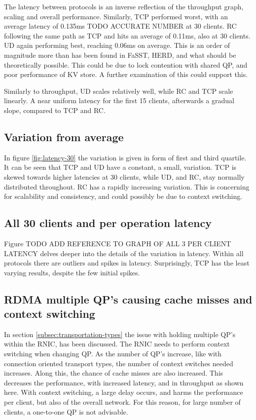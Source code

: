 The latency between protocols is an inverse reflection of the throughput graph, scaling and overall performance.
Similarly, TCP performed worst, with an average latency of 0.135ms TODO ACCURATE NUMBER at 30 clients.
RC following the same path as TCP and hits an average of 0.11ms, also at 30 clients.
UD again performing best, reaching 0.06ms on average.
This is an order of magnitude more than has been found in FaSST\cite{kalia2016fasst}, HERD\cite{kalia2014using}, and what should be theoretically possible.
This could be due to lock contention with shared QP, and poor performance of KV store.
A further examination of this could support this.

Similarly to throughput, UD scales relatively well, while RC and TCP scale linearly.
A near uniform latency for the first 15 clients, afterwards a gradual slope, compared to TCP and RC.

\subsection{Variation from average}
In figure \ref{fig:latency-30} the variation is given in form of first and third quartile.
It can be seen that TCP and UD have a constant, a small, variation.
TCP is skewed towards higher latencies at 30 clients, while UD, and RC, stay normally distributed throughout.
RC has a rapidly increasing variation.
This is concerning for scalability and consistency, and could possibly be due to context switching.

\subsection{All 30 clients and per operation latency}\label{subsec:all-30-clients-and-per-operation-latency}
Figure TODO ADD REFERENCE TO GRAPH OF ALL 3 PER CLIENT LATENCY delves deeper into the details of the variation in latency.
Within all protocols there are outliers and spikes in latency.
Surprisingly, TCP has the least varying results, despite the few initial spikes.

\subsection{RDMA multiple QP's causing cache misses and context switching}
In section \ref{subsec:transportation-types} the issue with holding multiple QP's within the RNIC, has been discussed.
The RNIC needs to perform context switching when changing QP.
As the number of QP's increase, like with connection oriented transport types, the number of context switches needed increases.
Along this, the chance of cache misses are also increased.
This decreases the performance, with increased latency, and in throughput as shown here.
With context switching, a large delay occurs, and harms the performance per client, but also of the overall network.
For this reason, for large number of clients, a one-to-one QP is not advisable.

